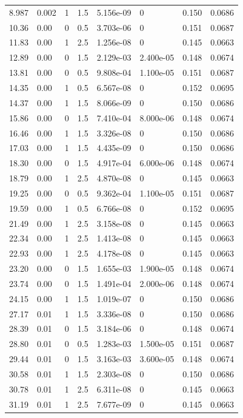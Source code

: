\documentclass[preview]{standalone}
\begin{document}
{{\begin{tabular}{L{1.2cm}C{1.2cm} C{0.3cm}C{0.5cm} C{1.4cm}C{1.4cm} C{1.4cm}C{1.4cm}}
  8.987  &  0.002  & 1     & 1.5 &  5.156e-09  & 0  & 0.150 &  0.0686   \\ 
  10.36  &  0.00  & 0     & 0.5 &  3.703e-06  & 0  & 0.151 &  0.0687   \\ 
  11.83  &  0.00  & 1     & 2.5 &  1.256e-08  & 0  & 0.145 &  0.0663   \\ 
  12.89  &  0.00  & 0     & 1.5 &  2.129e-03  & 2.400e-05  & 0.148 &  0.0674   \\ 
  13.81  &  0.00  & 0     & 0.5 &  9.808e-04  & 1.100e-05  & 0.151 &  0.0687   \\ 
  14.35  &  0.00  & 1     & 0.5 &  6.567e-08  & 0  & 0.152 &  0.0695   \\ 
  14.37  &  0.00  & 1     & 1.5 &  8.066e-09  & 0  & 0.150 &  0.0686   \\ 
  15.86  &  0.00  & 0     & 1.5 &  7.410e-04  & 8.000e-06  & 0.148 &  0.0674   \\ 
  16.46  &  0.00  & 1     & 1.5 &  3.326e-08  & 0  & 0.150 &  0.0686   \\ 
  17.03  &  0.00  & 1     & 1.5 &  4.435e-09  & 0  & 0.150 &  0.0686   \\ 
  18.30  &  0.00  & 0     & 1.5 &  4.917e-04  & 6.000e-06  & 0.148 &  0.0674   \\ 
  18.79  &  0.00  & 1     & 2.5 &  4.870e-08  & 0  & 0.145 &  0.0663   \\ 
  19.25  &  0.00  & 0     & 0.5 &  9.362e-04  & 1.100e-05  & 0.151 &  0.0687   \\ 
  19.59  &  0.00  & 1     & 0.5 &  6.766e-08  & 0  & 0.152 &  0.0695   \\ 
  21.49  &  0.00  & 1     & 2.5 &  3.158e-08  & 0  & 0.145 &  0.0663   \\ 
  22.34  &  0.00  & 1     & 2.5 &  1.413e-08  & 0  & 0.145 &  0.0663   \\ 
  22.93  &  0.00  & 1     & 2.5 &  4.178e-08  & 0  & 0.145 &  0.0663   \\ 
  23.20  &  0.00  & 0     & 1.5 &  1.655e-03  & 1.900e-05  & 0.148 &  0.0674   \\ 
  23.74  &  0.00  & 0     & 1.5 &  1.491e-04  & 2.000e-06  & 0.148 &  0.0674   \\ 
  24.15  &  0.00  & 1     & 1.5 &  1.019e-07  & 0  & 0.150 &  0.0686   \\ 
  27.17  &  0.01  & 1     & 1.5 &  3.336e-08  & 0  & 0.150 &  0.0686   \\ 
  28.39  &  0.01  & 0     & 1.5 &  3.184e-06  & 0  & 0.148 &  0.0674   \\ 
  28.80  &  0.01  & 0     & 0.5 &  1.283e-03  & 1.500e-05  & 0.151 &  0.0687   \\ 
  29.44  &  0.01  & 0     & 1.5 &  3.163e-03  & 3.600e-05  & 0.148 &  0.0674   \\ 
  30.58  &  0.01  & 1     & 1.5 &  2.303e-08  & 0  & 0.150 &  0.0686   \\ 
  30.78  &  0.01  & 1     & 2.5 &  6.311e-08  & 0  & 0.145 &  0.0663   \\ 
  31.19  &  0.01  & 1     & 2.5 &  7.677e-09  & 0  & 0.145 &  0.0663   \\ 
\hline 
\end{tabular} 

}}
\end{document}
